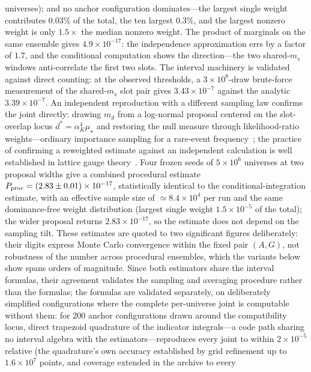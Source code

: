 \documentclass[aps,twocolumn,superscriptaddress,nofootinbib,floatfix]{revtex4-2}
\newcommand{\mstar}{\mu_\star}
\newcommand{\alphaK}{\alpha_K}
\begin{document}
universes); and no anchor configuration dominates---the largest single
weight contributes $0.03\%$ of the total, the ten largest $0.3\%$, and
the largest nonzero weight is only $1.5\times$ the median nonzero
weight. The product of marginals on
the same ensemble gives $4.9\times10^{-17}$: the independence
approximation errs by a factor of $1.7$, and the conditional computation
shows the direction---the two shared-$m_s$ windows anti-correlate the first
two slots. The interval machinery is validated against direct counting:
at the observed thresholds, a $3\times10^8$-draw brute-force measurement
of the shared-$m_s$ slot pair gives $3.43\times10^{-7}$ against the
analytic $3.39\times10^{-7}$. An independent
reproduction with a different sampling law confirms the joint directly:
drawing $m_d$ from a log-normal proposal centered on the slot-overlap
locus $d^*=\alphaK^4\mstar$ and restoring the null measure through
likelihood-ratio weights---ordinary importance sampling for a
rare-event frequency~\cite{Bucklew2004}; the practice of confirming a
reweighted estimate against an independent calculation is well
established in lattice gauge theory~\cite{Caselle2016,Francesconi2020}.
Four frozen
seeds of $5\times10^6$ universes at two proposal widths give a combined procedural estimate
$P_{\rm proc}=(2.83\pm0.01)\times10^{-17}$, statistically identical to the
conditional-integration estimate, with an effective sample size of
$\simeq8.4\times10^4$ per run and the same dominance-free weight
distribution (largest single weight $1.5\times10^{-5}$ of the total);
the wider proposal returns $2.83\times10^{-17}$, so the estimate does
not depend on the sampling tilt. These estimates are quoted to two
significant figures deliberately: their digits express Monte Carlo
convergence within the fixed pair $(A,G)$, not robustness of the number
across procedural ensembles, which the variants below show spans orders
of magnitude. Since both estimators share the
interval formulas, their agreement validates the sampling and averaging
procedure rather than the formulas; the formulas are validated separately,
on deliberately simplified configurations where the complete per-universe
joint is computable without them: for $200$ anchor configurations drawn
around the compatibility locus, direct trapezoid quadrature of the
indicator integrals---a code path sharing no interval algebra with the
estimators---reproduces every joint to within $2\times10^{-5}$ relative
(the quadrature's own accuracy established by grid refinement up to
$1.6\times10^7$ points, and coverage extended in the archive to every
\end{document}
